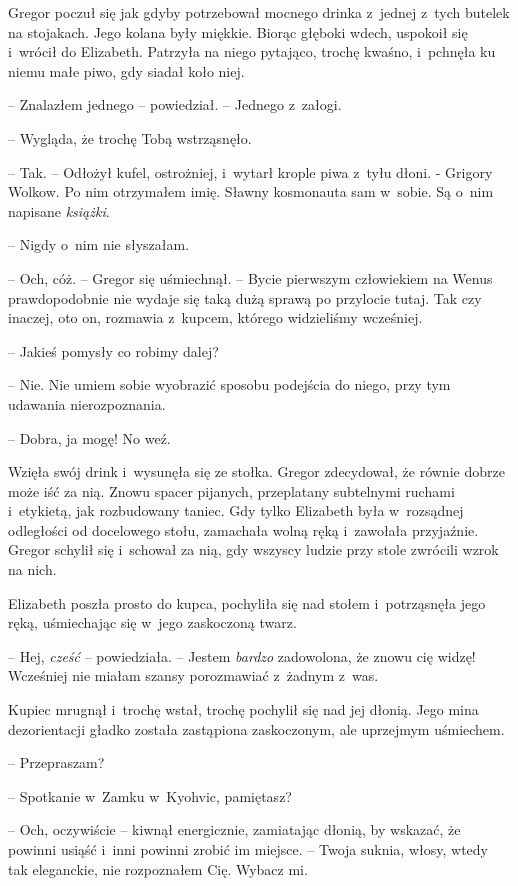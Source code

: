 \documentclass[oneside,polish,12pt,sfheadings]{mwbk}
\begin{document}
Gregor poczuł się jak gdyby potrzebował mocnego drinka z~jednej z~tych
butelek na stojakach. Jego kolana były miękkie. Biorąc głęboki wdech,
uspokoił się i~wrócił do Elizabeth. Patrzyła na niego pytająco, trochę
kwaśno, i~pchnęła ku niemu małe piwo, gdy siadał koło niej.

-- Znalazłem jednego -- powiedział. -- Jednego z~załogi.

-- Wygląda, że trochę Tobą wstrząsnęło.

-- Tak. -- Odłożył kufel, ostrożniej, i~wytarł krople piwa z~tyłu dłoni. -
Grigory Wolkow. Po nim otrzymałem imię. Sławny kosmonauta sam w~sobie.
Są o~nim napisane \emph{książki}.

-- Nigdy o~nim nie słyszałam.

-- Och, cóż. -- Gregor się uśmiechnął. -- Bycie pierwszym człowiekiem na
Wenus prawdopodobnie nie wydaje się taką dużą sprawą po przylocie tutaj.
Tak czy inaczej, oto on, rozmawia z~kupcem, którego widzieliśmy
wcześniej.

-- Jakieś pomysły co robimy dalej?

-- Nie. Nie umiem sobie wyobrazić sposobu podejścia do niego, przy tym
udawania nierozpoznania.

-- Dobra, ja mogę! No weź.

Wzięła swój drink i~wysunęła się ze stołka. Gregor zdecydował, że równie
dobrze może iść za nią. Znowu spacer pijanych, przeplatany subtelnymi
ruchami i~etykietą, jak rozbudowany taniec. Gdy tylko Elizabeth była w~rozsądnej odległości od docelowego stołu, zamachała wolną ręką i~zawołała przyjaźnie. Gregor schylił się i~schował za nią, gdy wszyscy ludzie przy stole zwrócili wzrok na nich.

Elizabeth poszła prosto do kupca, pochyliła się nad stołem i~potrząsnęła
jego ręką, uśmiechając się w~jego zaskoczoną twarz.

-- Hej, \emph{cześć} -- powiedziała. -- Jestem \emph{bardzo} zadowolona, że
znowu cię widzę! Wcześniej nie miałam szansy porozmawiać z~żadnym z~was.

Kupiec mrugnął i~trochę wstał, trochę pochylił się nad jej dłonią. Jego
mina dezorientacji gładko została zastąpiona zaskoczonym, ale uprzejmym
uśmiechem.

-- Przepraszam?

-- Spotkanie w~Zamku w~Kyohvic, pamiętasz?

-- Och, oczywiście -- kiwnął energicznie, zamiatając dłonią, by wskazać,
że powinni usiąść i~inni powinni zrobić im miejsce. -- Twoja suknia,
włosy, wtedy tak eleganckie, nie rozpoznałem Cię. Wybacz mi.
\end{document}
